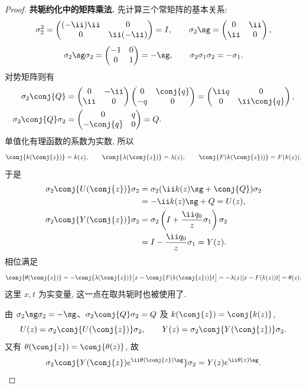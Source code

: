 \begin{proof}

\par\medskip\noindent\textbf{共轭约化中的矩阵乘法.}\quad 
先计算三个常矩阵的基本关系:
\[
\sigma_2^2
=\begin{pmatrix}(-\ii)\ii&0\\0&\ii(-\ii)\end{pmatrix}=I,
\qquad
\sigma_2\sg
=\begin{pmatrix}0&\ii\\\ii&0\end{pmatrix},
\]
\[
\sigma_2\sg\sigma_2
=\begin{pmatrix}-1&0\\0&1\end{pmatrix}=-\sg,
\qquad
\sigma_2\sigma_1\sigma_2=-\sigma_1.
\]
对势矩阵则有
\begin{align*}
\sigma_2\conj{Q}
&=\begin{pmatrix}0&-\ii\\\ii&0\end{pmatrix}
\begin{pmatrix}0&\conj{q}\\-q&0\end{pmatrix}
=\begin{pmatrix}\ii q&0\\0&\ii\conj{q}\end{pmatrix},\\
\sigma_2\conj{Q}\sigma_2
&=\begin{pmatrix}0&q\\-\conj{q}&0\end{pmatrix}=Q.
\end{align*}
单值化有理函数的系数为实数, 所以
\[
\conj{k(\conj{z})}=k(z),
\qquad
\conj{\lambda(\conj{z})}=\lambda(z),
\qquad
\conj{F(k(\conj{z}))}=F(k(z)).
\]
于是
\begin{align*}
\sigma_2\conj{U(\conj{z})}\sigma_2
&=\sigma_2(\ii k(z)\sg+\conj{Q})\sigma_2\\
&=-\ii k(z)\sg+Q=U(z),\\
\sigma_2\conj{Y(\conj{z})}\sigma_2
&=\sigma_2\left(I+\dfrac{\ii q_0}{z}\sigma_1\right)\sigma_2\\
&=I-\dfrac{\ii q_0}{z}\sigma_1=Y(z).
\end{align*}
相位满足
\[
\conj{\theta(\conj{z})}
=-\conj{\lambda(\conj{z})}
\bigl[x-\conj{F(k(\conj{z}))}t\bigr]
=-\lambda(z)[x-F(k(z))t]=\theta(z).
\]
这里 $x,t$ 为实变量, 这一点在取共轭时也被使用了.

由 $\sigma_2\sg\sigma_2=-\sg$、$\sigma_2\conj{Q}\sigma_2=Q$ 及 $k(\conj{z})=\conj{k(z)}$,
\[
U(z)=\sigma_2\conj{U(\conj{z})}\sigma_2,\qquad
Y(z)=\sigma_2\conj{Y(\conj{z})}\sigma_2.
\]
又有 $\theta(\conj{z})=\conj{\theta(z)}$, 故
\[
\sigma_2\conj{Y(\conj{z})e^{\ii\theta(\conj{z})\sg}}\sigma_2
=Y(z)e^{\ii\theta(z)\sg}.
\]


\end{proof}
